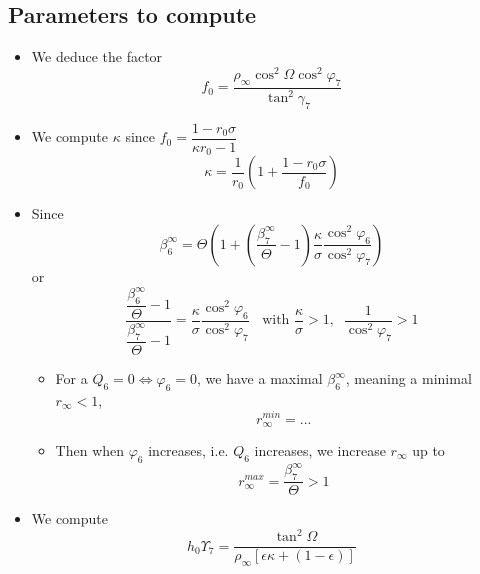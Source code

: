 \documentclass[aps,onecolumn,10pt]{revtex4}
\begin{document}
\subsection{Parameters to compute}

\begin{itemize}
\item We deduce the factor
\begin{equation}
f_0  = \dfrac{\rho_\infty \cos^2\Omega \cos^2\varphi_7}{\tan^2 \gamma_7}
\end{equation}

\item We compute $\kappa$ since $f_0=\dfrac{1-r_0\sigma}{\kappa r_0-1}$
\begin{equation}
	\kappa = \dfrac{1}{r_0}\left( 1 + \dfrac{1-r_0\sigma}{f_0}\right)
\end{equation}

\item Since
	$$
		\beta_6^\infty = \Theta \left( 1 + \left(\dfrac{\beta_7^\infty}{\Theta}-1\right) \dfrac{\kappa}{\sigma} \dfrac{\cos^2\varphi_6}{\cos^2\varphi_7} \right)
	$$
or
\begin{equation}
	\dfrac
	{ 
		\dfrac{\beta_6^\infty}{\Theta}-1
	}
	{
		\dfrac{\beta_7^\infty}{\Theta}-1
	} = \dfrac{\kappa}{\sigma} \dfrac{\cos^2\varphi_6}{\cos^2\varphi_7} \;\; \text{ with } \dfrac{\kappa}{\sigma}>1, \;\; \dfrac{1}{\cos^2\varphi_7}>1
\end{equation}
\begin{itemize}
\item For a $Q_6=0 \Leftrightarrow \varphi_6=0$, we have a maximal $\beta_6^\infty$, meaning a minimal $r_\infty<1$, 
\begin{equation}
	r_\infty^{min} = ...
\end{equation}

\item Then when $\varphi_6$ increases, i.e. $Q_6$ increases, we increase $r_\infty$ up to 
\begin{equation}
		r_\infty^{max} = \frac{\beta_7^\infty}{\Theta} > 1
\end{equation}

\end{itemize}

\item We compute
\begin{equation}
	h_0 \Upsilon_7 = \dfrac{\tan^2\Omega}{\rho_\infty\left[\epsilon\kappa+(1-\epsilon)\right]}
\end{equation}


\end{itemize}
\end{document}

